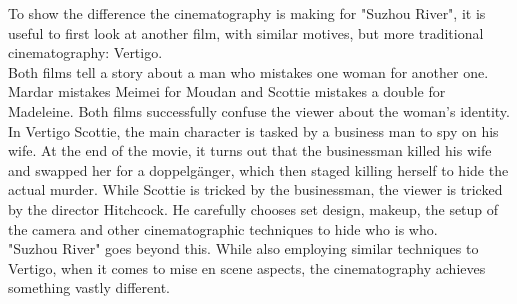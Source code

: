 \documentclass[fleqn,14pt]{article}
\begin{document}
To show the difference the cinematography is making for "Suzhou River", it is useful to first look
at another film, with similar motives, but more traditional cinematography: Vertigo.\\
Both films tell a story about a man who mistakes one woman for another one.
Mardar mistakes Meimei for Moudan and Scottie mistakes a double for Madeleine.
Both films successfully confuse the viewer about the woman's identity. \\
In Vertigo Scottie, the main character is tasked by a business
man to spy on his wife. At the end of the movie, it turns out that the businessman killed his wife
and swapped her for a doppelgänger, which then staged killing herself to hide the actual murder. 
While Scottie is tricked by the businessman, the viewer is tricked by the director Hitchcock. He
carefully chooses set design, makeup, the setup of the camera and other cinematographic techniques
to hide who is who.\\
"Suzhou River" goes beyond this. While also employing similar techniques to Vertigo, when it comes to
mise en scene aspects, the cinematography achieves something vastly different.\\
\end{document}
